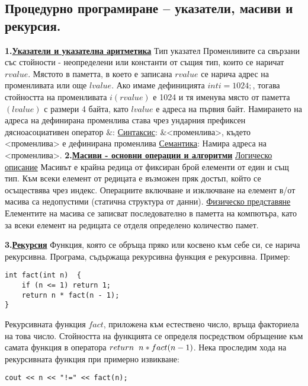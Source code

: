 \documentclass{article}
\begin{document}
\subsection*{Процедурно програмиране – указатели, масиви и рекурсия.}

\textbf{1.\underline{Указатели и указателна аритметика}} \newline\newline
Тип указател
Променливите са свързани със стойности - неопределени или константи от същия тип, които се наричат $rvalue$. Мястото в паметта,
в което е записана $rvalue$ се нарича адрес на променливата или още $lvalue$. Ако имаме дефиницията $int i = 1024;$, тогава
стойността на променливата $i (rvalue)$ е 1024 и тя именува място от паметта $(lvalue)$ с размери 4 байта, като $lvalue$ е адреса
на първия байт. Намирането на адреса на дефинирана променлива става чрез ундарния префиксен дясноасоциативен оператор $\&$: \newline\newline
\underline{Синтаксис}:
\&<променлива>, където <променлива> е дефинирана променлива \newline\newline
\underline{Семантика}:
Намира адреса на <променлива>. \newline\newline
\textbf{2.\underline{Масиви - основни операции и алгоритми}} \newline\newline
\underline{Логическо описание} \newline
Масивът е крайна редица от фиксиран брой елементи от един и същ тип. Към всеки елемент от редицата е възможен пряк достъп, който
се осъществява чрез индекс. Операциите включване и изключване на елемент в/от масива са недопустими (статична структура от данни). \newline\newline
\underline{Физическо представяне} \newline
Елементите на масива се записват последователно в паметта на компютъра, като за всеки елемент на редицата се отделя определено
количество памет.

\textbf{3.\underline{Рекурсия}} \newline\newline
Функция, която се обръща пряко или косвено към себе си, се нарича рекурсивна. Програма, съдържаща рекурсивна функция е рекурсивна.
Пример:
\begin{lstlisting}
int fact(int n)  { 
    if (n <= 1) return 1;
    return n * fact(n - 1); 
} 
\end{lstlisting}
Рекурсивната функция $fact$, приложена към естествено число, връща факториела на това число. Стойността на функцията се определя
посредством обръщение към самата функция в оператора $return \hspace{0.2cm} n * fact(n - 1)$. Нека проследим хода на рекурсивната функция при
примерно извикване:
\begin{lstlisting}
cout << n << "!=" << fact(n);
\end{lstlisting}
\end{document}
